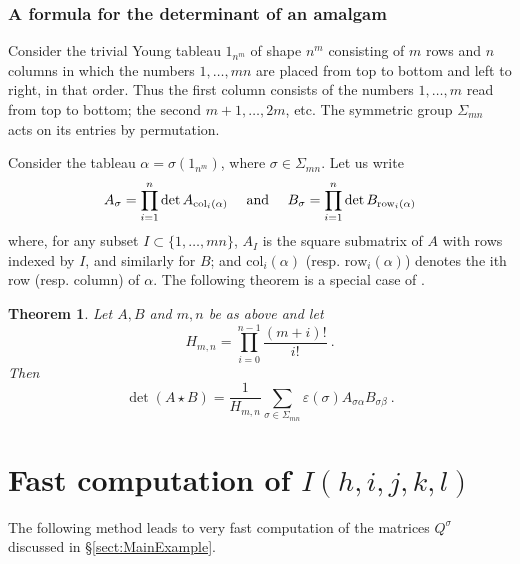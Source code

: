 \documentclass[a4paper,10pt]{amsart}
\newtheorem{thm}{Theorem}[section]
\theoremstyle{definition}
\theoremstyle{remark}
\numberwithin{equation}{section}
\newcommand{\0}{\color{blue}{\mathsf{0}}}
\begin{document}
\subsubsection{A  formula for the  determinant of an amalgam}
 
 Consider the trivial Young tableau  $1_{n^m}$ of shape $n^m$ consisting of $m$ rows and $n$ columns in which the numbers $1,\ldots,mn$ are placed from top to bottom and left to right, in that order. Thus the first column consists of the numbers $1,\ldots, m$ read from top to bottom; the second $m+1, \ldots, 2m$, etc.
 The symmetric group $\Sigma_{mn}$ acts on its entries by permutation. 

Consider the tableau $\alpha= \sigma  (1_{n^m})$, where $\sigma \in \Sigma_{mn}$. Let us write
\[  A_{\sigma} =\prod_{i=1}^n \det A_{\mathrm{col}_i(\alpha)} \quad \hbox{ and } \quad  B_{\sigma} =\prod_{i=1}^n \det B_{\mathrm{row}_i(\alpha)} \]
where, for any subset $I \subset \{1,\ldots, mn\}$, $A_I$ is the square submatrix of $A$ with rows indexed by $I$, and similarly for $B$; and $\mathrm{col}_i(\alpha)$ (resp. $\mathrm{row}_i(\alpha)$) denotes the ith row (resp. column) of $\alpha$. 
 The following theorem is a special case of \cite[Theorem 3.8]{BrVdM}.
 
 
 
 
 \begin{thm}  \label{thm: detAmalgam} Let $A,B$ and $m,n$ be as above and let  
 \begin{equation} \label{eqn: Hmndef}  H_{m,n} = \prod_{i=0}^{n-1} \frac{(m+i)!}{i!} \ . 
 \end{equation} 
 Then 
 \[ \det(A\star B) = \frac{1}{H_{m,n}} \sum_{\sigma \in \Sigma_{mn}} \varepsilon(\sigma) A_{\sigma \alpha} B_{\sigma \beta} \  . \]
  \end{thm} 
   

\newpage
\section{Fast computation of $I(h,i,j,k,l)$}

The following method leads to very fast computation of the matrices  $Q^{\sigma}$ discussed in \S\ref{sect:MainExample}.
\end{document}
